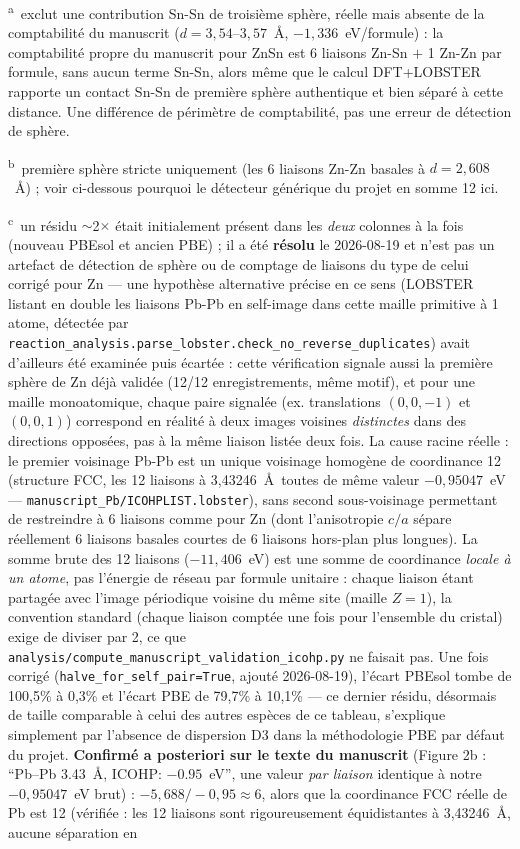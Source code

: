 \vspace{0.3em}
\noindent\textsuperscript{a}~exclut une contribution Sn-Sn de troisième sphère, réelle mais absente de la comptabilité du manuscrit ($d=3{,}54$--$3{,}57$~\AA, $-1{,}336$~eV/formule) : la comptabilité propre du manuscrit pour ZnSn est 6 liaisons Zn-Sn $+$ 1 Zn-Zn par formule, sans aucun terme Sn-Sn, alors même que le calcul DFT+LOBSTER rapporte un contact Sn-Sn de première sphère authentique et bien séparé à cette distance. Une différence de périmètre de comptabilité, pas une erreur de détection de sphère.

\noindent\textsuperscript{b}~première sphère stricte uniquement (les 6 liaisons Zn-Zn basales à $d=2{,}608$~\AA) ; voir ci-dessous pourquoi le détecteur générique du projet en somme 12 ici.

\noindent\textsuperscript{c}~un résidu $\sim$2$\times$ était initialement présent dans les \emph{deux} colonnes à la fois (nouveau PBEsol et ancien PBE) ; il a été \textbf{résolu} le 2026-08-19 et n'est pas un artefact de détection de sphère ou de comptage de liaisons du type de celui corrigé pour Zn --- une hypothèse alternative précise en ce sens (LOBSTER listant en double les liaisons Pb-Pb en self-image dans cette maille primitive à 1 atome, détectée par \texttt{reaction\_analysis.parse\_lobster.check\_no\_reverse\_duplicates}) avait d'ailleurs été examinée puis écartée : cette vérification signale aussi la première sphère de Zn déjà validée (12/12 enregistrements, même motif), et pour une maille monoatomique, chaque paire signalée (ex. translations $(0,0,-1)$ et $(0,0,1)$) correspond en réalité à deux images voisines \emph{distinctes} dans des directions opposées, pas à la même liaison listée deux fois. La cause racine réelle : le premier voisinage Pb-Pb est un unique voisinage homogène de coordinance 12 (structure FCC, les 12 liaisons à 3,43246~\AA\ toutes de même valeur $-0{,}95047$~eV --- \texttt{manuscript\_Pb/ICOHPLIST.lobster}), sans second sous-voisinage permettant de restreindre à 6 liaisons comme pour Zn (dont l'anisotropie $c/a$ sépare réellement 6 liaisons basales courtes de 6 liaisons hors-plan plus longues). La somme brute des 12 liaisons ($-11{,}406$~eV) est une somme de coordinance \emph{locale à un atome}, pas l'énergie de réseau par formule unitaire : chaque liaison étant partagée avec l'image périodique voisine du même site (maille $Z=1$), la convention standard (chaque liaison comptée une fois pour l'ensemble du cristal) exige de diviser par 2, ce que \texttt{analysis/compute\_manuscript\_validation\_icohp.py} ne faisait pas. Une fois corrigé (\texttt{halve\_for\_self\_pair=True}, ajouté 2026-08-19), l'écart PBEsol tombe de 100,5\% à 0,3\% et l'écart PBE de 79,7\% à 10,1\% --- ce dernier résidu, désormais de taille comparable à celui des autres espèces de ce tableau, s'explique simplement par l'absence de dispersion D3 dans la méthodologie PBE par défaut du projet. \textbf{Confirmé a posteriori sur le texte du manuscrit} (Figure 2b : ``Pb--Pb 3.43~\AA, ICOHP: $-0.95$~eV'', une valeur \emph{par liaison} identique à notre $-0{,}95047$~eV brut) : $-5{,}688/-0{,}95\approx6$, alors que la coordinance FCC réelle de Pb est 12 (vérifiée : les 12 liaisons sont rigoureusement équidistantes à 3,43246~\AA, aucune séparation en 